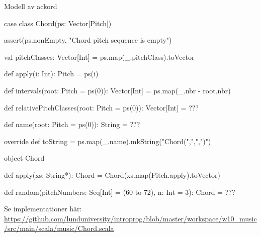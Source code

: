 \begin{Slide}{Modell av ackord}
\begin{CodeSmall}
case class Chord(ps: Vector[Pitch]) {

  assert(ps.nonEmpty, "Chord pitch sequence is empty")

  val pitchClasses: Vector[Int]   = ps.map(_.pitchClass).toVector

  def apply(i: Int): Pitch = ps(i)

  def intervals(root: Pitch = ps(0)): Vector[Int] = ps.map(_.nbr - root.nbr)

  def relativePitchClasses(root: Pitch = ps(0)): Vector[Int] = ???

  def name(root: Pitch = ps(0)): String = ???

  override def toString = ps.map(_.name).mkString("Chord(",",",")")
}

object Chord {
  def apply(xs: String*): Chord = Chord(xs.map(Pitch.apply).toVector)

  def random(pitchNumbers: Seq[Int] = (60 to 72), n: Int = 3): Chord = ???
}
\end{CodeSmall}
\SlideFontTiny
Se implementationer här:
\url{https://github.com/lunduniversity/introprog/blob/master/workspace/w10_music/src/main/scala/music/Chord.scala}
\end{Slide}


